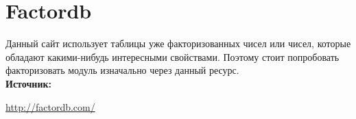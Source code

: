 \documentclass[12pt,a4paper]{scrartcl}
\begin{document}
\section{Factordb}

Данный сайт использует таблицы уже факторизованных чисел или чисел, которые обладают какими-нибудь интересными свойствами. Поэтому стоит попробовать факторизовать модуль изначально через данный ресурс.\\

\textbf{Источник:}

\href{http://factordb.com/}{http://factordb.com/}
\end{document}

